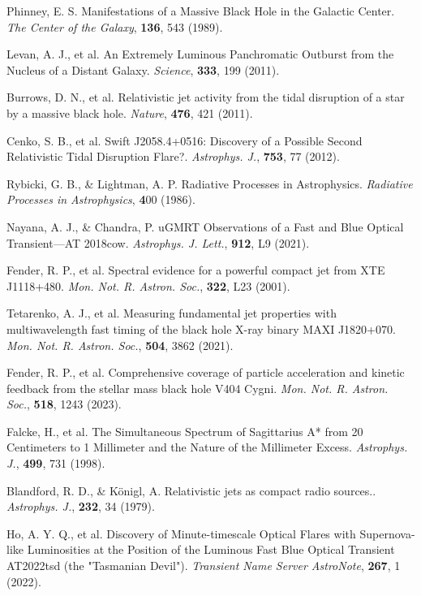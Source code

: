 \documentclass{nature_plusfigure}
\newcommand{\mn}{{Mon. Not. R. Astron. Soc.}}
\newcommand{\mnras}{\mn}
\newcommand{\apj}{{Astrophys. J.}}
\newcommand{\apjl}{{Astrophys. J. Lett.}}
\newcommand{\nat}{{Nature}}
\begin{document}
\begin{methods}
\begin{thebibliography}{10}
 
  Phinney, E. S. Manifestations of a Massive Black Hole in the Galactic Center. \emph{The Center of the Galaxy}, \textbf{136}, 543 (1989). 
 
  Levan, A. J., et al. An Extremely Luminous Panchromatic Outburst from the Nucleus of a Distant Galaxy. \emph{Science}, \textbf{333}, 199 (2011). 

  Burrows, D. N., et al. Relativistic jet activity from the tidal disruption of a star by a massive black hole. \emph{\nat}, \textbf{476}, 421 (2011). 

 Cenko, S. B., et al. Swift J2058.4+0516: Discovery of a Possible Second Relativistic Tidal Disruption Flare?. \emph{\apj}, \textbf{753}, 77 (2012). 


 Rybicki, G. B., \& Lightman, A. P. Radiative Processes in Astrophysics. \emph{Radiative Processes in Astrophysics}, \textbf 400 (1986). 

 Nayana, A. J., \& Chandra, P. uGMRT Observations of a Fast and Blue Optical Transient—AT 2018cow. \emph{\apjl}, \textbf{912}, L9 (2021). 

 Fender, R. P., et al. Spectral evidence for a powerful compact jet from XTE J1118+480. \emph{\mnras}, \textbf{322}, L23 (2001).

 Tetarenko, A. J., et al. Measuring fundamental jet properties with multiwavelength fast timing of the black hole X-ray binary MAXI J1820+070. \emph{\mnras}, \textbf{504}, 3862 (2021).  

  Fender, R. P., et al. Comprehensive coverage of particle acceleration and kinetic feedback from the stellar mass black hole V404 Cygni. \emph{\mnras}, \textbf{518}, 1243 (2023). 
 
  Falcke, H., et al. The Simultaneous Spectrum of Sagittarius A* from 20 Centimeters to 1 Millimeter and the Nature of the Millimeter Excess. \emph{\apj}, \textbf{499}, 731 (1998). 

  Blandford, R. D., \& Königl, A. Relativistic jets as compact radio sources.. \emph{\apj}, \textbf{232}, 34 (1979). 


 Ho, A. Y. Q., et al. Discovery of Minute-timescale Optical Flares with Supernova-like Luminosities at the Position of the Luminous Fast Blue Optical Transient AT2022tsd (the "Tasmanian Devil"). \emph{Transient Name Server AstroNote}, \textbf{267}, 1 (2022). 


\end{thebibliography}
\end{methods}
\end{document}
